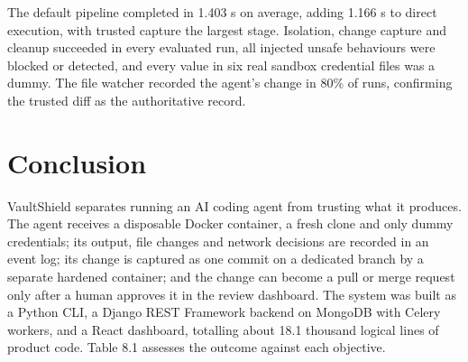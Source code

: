 \documentclass[12pt,a4paper,oneside]{report}
\begin{document}
The default pipeline completed in 1.403 s on average, adding 1.166 s to direct execution, with trusted capture the largest stage. Isolation, change capture and cleanup succeeded in every evaluated run, all injected unsafe behaviours were blocked or detected, and every value in six real sandbox credential files was a dummy. The file watcher recorded the agent's change in 80\% of runs, confirming the trusted diff as the authoritative record.

\clearpage

\chapter{Conclusion}\label{conclusion}

VaultShield separates running an AI coding agent from trusting what it produces. The agent receives a disposable Docker container, a fresh clone and only dummy credentials; its output, file changes and network decisions are recorded in an event log; its change is captured as one commit on a dedicated branch by a separate hardened container; and the change can become a pull or merge request only after a human approves it in the review dashboard. The system was built as a Python CLI, a Django REST Framework backend on MongoDB with Celery workers, and a React dashboard, totalling about 18.1 thousand logical lines of product code. Table 8.1 assesses the outcome against each objective.
\end{document}
